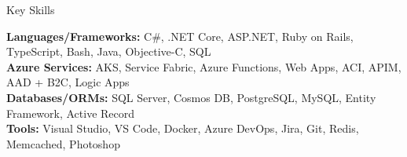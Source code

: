 \documentclass{resume} %
\begin{document}

\begin{rSection}{Key Skills}


\textbf{Languages/Frameworks:} C\#, .NET Core, ASP.NET, Ruby on Rails, TypeScript, Bash, Java, Objective-C, SQL  \\
\textbf{Azure Services:} AKS, Service Fabric, Azure Functions, Web Apps, ACI, APIM, AAD + B2C, Logic Apps  \\
\textbf{Databases/ORMs:} SQL Server, Cosmos DB, PostgreSQL, MySQL, Entity Framework, Active Record  \\
\textbf{Tools:} Visual Studio, VS Code, Docker, Azure DevOps, Jira, Git, Redis, Memcached, Photoshop

\end{rSection}

\end{document}
